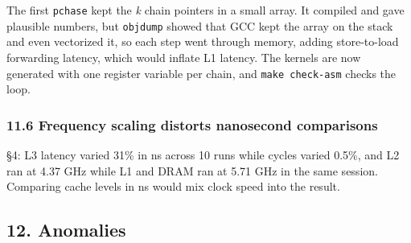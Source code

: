 \documentclass[10pt,letterpaper]{article}
\begin{document}
The first \texttt{pchase} kept the \emph{k} chain pointers
in a small array. It compiled and gave plausible numbers,
but \texttt{objdump} showed that GCC kept the array on the
stack and even vectorized it, so each step went through
memory, adding store-to-load forwarding latency, which would
inflate L1 latency. The kernels are now generated with one
register variable per chain, and \texttt{make\ check-asm}
checks the loop.

\hypertarget{frequency-scaling-distorts-nanosecond-comparisons}{%
\subsubsection{11.6 Frequency scaling distorts nanosecond
comparisons}\label{frequency-scaling-distorts-nanosecond-comparisons}}

§4: L3 latency varied 31\% in ns across 10 runs while cycles
varied 0.5\%, and L2 ran at 4.37 GHz while L1 and DRAM ran
at 5.71 GHz in the same session. Comparing cache levels in
ns would mix clock speed into the result.

\hypertarget{anomalies}{%
\subsection{12. Anomalies}\label{anomalies}}
\end{document}
